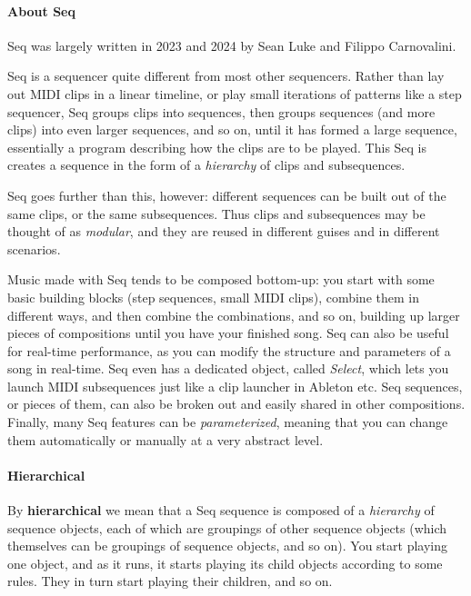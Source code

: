 \documentclass[twoside,10pt]{article}
\begin{document}
\paragraph{About Seq} 
Seq was largely written in 2023 and 2024 by Sean Luke and Filippo Carnovalini.

Seq is a sequencer quite different from most other sequencers.  Rather than lay out MIDI clips in a linear timeline, or play small iterations of patterns like a step sequencer, Seq groups clips into sequences, then groups sequences (and more clips) into even larger sequences, and so on, until it has formed a large sequence, essentially a program describing how the clips are to be played.  This Seq is creates a sequence in the form of a {\it hierarchy} of clips and subsequences.

Seq goes further than this, however: different sequences can be built out of the same clips, or the same subsequences.  Thus clips and subsequences may be thought of as {\it modular}, and they are reused in different guises and in different scenarios.  

Music made with Seq tends to be composed bottom-up: you start with some basic building blocks (step sequences, small MIDI clips), combine them in different ways, and then combine the combinations, and so on, building up larger pieces of compositions until you have your finished song.  Seq can also be useful for real-time performance, as you can modify the structure and parameters of a song in real-time.  Seq even has a dedicated object, called {\it Select}, which lets you launch MIDI subsequences just like a clip launcher in Ableton etc.  Seq sequences, or pieces of them, can also be broken out and easily shared in other compositions.  Finally, many Seq features can be {\it parameterized}, meaning that you can change them automatically or manually at a very abstract level.

\paragraph{Hierarchical}
By {\bf hierarchical} we mean that a Seq sequence is composed of a {\it hierarchy} of sequence objects, each of which are groupings of other sequence objects (which themselves can be groupings of sequence objects, and so on).  You start playing one object, and as it runs, it starts playing its child objects according to some rules.  They in turn start playing their children, and so on.
\end{document}
